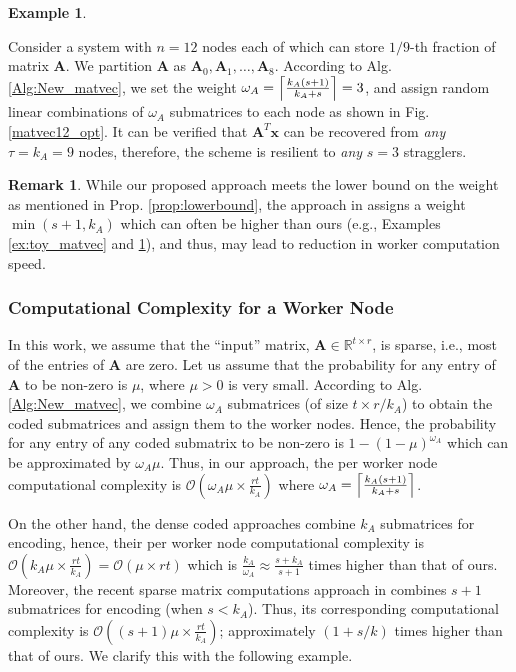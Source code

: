 \documentclass[conference]{IEEEtran}
\theoremstyle{definition}
\newtheorem{example}{Example}
\newtheorem{remark}{Remark}
\newcommand{\calO}{\mathcal{O}}
\newcommand{\bfA}{\mathbf{A}}
\newcommand{\bfx}{\mathbf{x}}
\begin{document}
\begin{example}
\label{ex:12_3}

Consider a system with $n = 12$ nodes each of which can store $1/9$-th fraction of matrix $\bfA$. We partition $\bfA$ as $\bfA_0, \bfA_1, \dots, \bfA_8$. According to Alg. \ref{Alg:New_matvec}, we set the weight $\omega_A = \Bigl\lceil\frac{k_A(s+1)}{k_A + s}\Bigr\rceil = 3$, and assign random linear combinations of $\omega_A$ submatrices to each node as shown in Fig. \ref{matvec12_opt}. It can be verified that $\bfA^T \bfx$ can be recovered from {\it any} $\tau = k_A = 9$ nodes, therefore, the scheme is resilient to {\it any} $s = 3$ stragglers.
\end{example}

\begin{remark}
\label{rem:betterthanjsait}
While our proposed approach meets the lower bound on the weight as mentioned in Prop. \ref{prop:lowerbound}, the approach in \cite{das2023jsait_submitted} assigns a weight $\min(s+1, k_A)$ which can often be higher than ours (e.g., Examples \ref{ex:toy_matvec} and \ref{ex:12_3}), and thus, may lead to reduction in worker computation speed. 
\end{remark}

\subsubsection{Computational Complexity for a Worker Node} 
\label{sec:compcomplexity}
In this work, we assume that the ``input'' matrix, $\bfA \in \mathbb{R}^{t \times r}$, is sparse, i.e., most of the entries of $\bfA$ are zero. Let us assume that the probability for any entry of $\bfA$ to be non-zero is $\mu$, where $\mu > 0$ is very small. According to Alg. \ref{Alg:New_matvec}, we combine $\omega_A$ submatrices (of size $t \times r/k_A$) to obtain the coded submatrices and assign them to the worker nodes. Hence, the probability for any entry of any coded submatrix to be non-zero is $1 - (1 - \mu)^{\omega_A}$ which can be approximated by $\omega_A \mu$. Thus, in our approach, the per worker node computational complexity is $\calO \left( \omega_A \mu \times  \frac{rt}{k_A} \right)$ where $\omega_A = \Bigl\lceil\frac{k_A(s+1)}{k_A + s}\Bigr\rceil$.

On the other hand, the dense coded approaches \cite{yu2017polynomial,8849468, 8919859} combine $k_A$ submatrices for encoding, hence, their per worker node computational complexity is $\calO \left( k_A \mu \times  \frac{rt}{k_A} \right) = \calO \left( \mu \times  r t \right)$ which is $\frac{k_A}{\omega_A} \approx \frac{s + k_A}{ s + 1}$ times higher than that of ours. Moreover, the recent sparse matrix computations approach in \cite{das2023jsait_submitted} combines $s+1$ submatrices for encoding (when $s < k_A$). Thus, its corresponding computational complexity is $\calO \left( (s+1) \mu \times  \frac{rt}{k_A} \right)$; approximately $(1 + s/k)$ times higher than that of ours. We clarify this with the following example.
\end{document}
